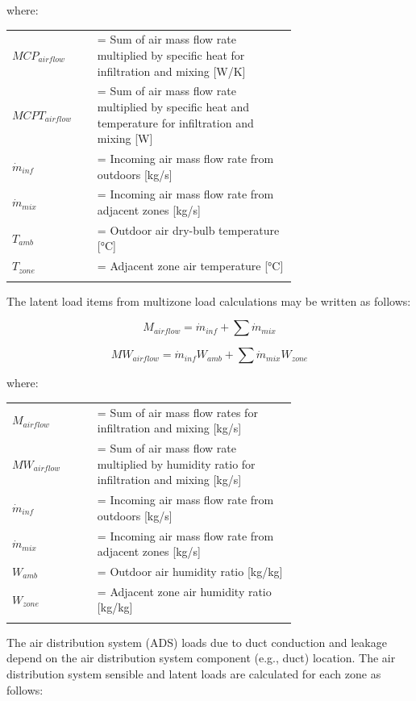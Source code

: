 where:

\begin{tabular}{lp{0.7\linewidth}}
\\
$MCP_{airflow}$ &= Sum of air mass flow rate multiplied by specific heat for infiltration and mixing [W/K]\\
$MCPT_{airflow}$ &= Sum of air mass flow rate multiplied by specific heat and temperature for infiltration and mixing [W]\\
$\dot{m}_{inf}$ &= Incoming air mass flow rate from outdoors [kg/s]\\
$\dot{m}_{mix}$ &= Incoming air mass flow rate from adjacent zones [kg/s]\\
$T_{amb}$ &= Outdoor air dry-bulb temperature [°C]\\
$T_{zone}$ &= Adjacent zone air temperature [°C]\\
\\
\end{tabular}

The latent load items from multizone load calculations may be written as follows:

\begin{equation}
M_{airflow} = \dot{m}_{inf} + \sum \dot{m}_{mix}
\end{equation}

\begin{equation}
MW_{airflow} = \dot{m}_{inf} W_{amb} + \sum \dot{m}_{mix} W_{zone}
\end{equation}

where:

\begin{tabular}{lp{0.7\linewidth}}
\\
$M_{airflow}$ &= Sum of air mass flow rates for infiltration and mixing [kg/s]\\
$MW_{airflow}$ &= Sum of air mass flow rate multiplied by humidity ratio for infiltration and mixing [kg/s]\\
$\dot{m}_{inf}$ &= Incoming air mass flow rate from outdoors [kg/s]\\
$\dot{m}_{mix}$ &= Incoming air mass flow rate from adjacent zones [kg/s]\\
$W_{amb}$ &= Outdoor air humidity ratio [kg/kg]\\
$W_{zone}$ &= Adjacent zone air humidity ratio [kg/kg]\\
\\
\end{tabular}

The air distribution system (ADS) loads due to duct conduction and leakage depend on the air distribution system component (e.g., duct) location. The air distribution system sensible and latent loads are calculated for each zone as follows:

